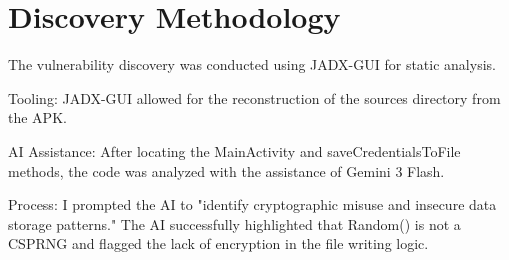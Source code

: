 
\section{Discovery Methodology}
\label{sec:figs}

The vulnerability discovery was conducted using JADX-GUI for static analysis.

Tooling: JADX-GUI allowed for the reconstruction of the sources directory from the APK.

AI Assistance: After locating the MainActivity and saveCredentialsToFile methods, the code was analyzed with the assistance of Gemini 3 Flash.

Process: I prompted the AI to "identify cryptographic misuse and insecure data storage patterns." The AI successfully highlighted that Random() is not a CSPRNG and flagged the lack of encryption in the file writing logic.




